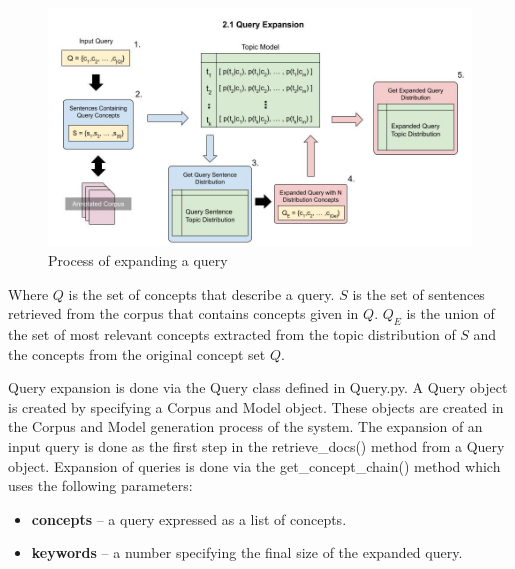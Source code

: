 \begin{figure}[h]
    \centering
         \includegraphics[width=1.0\textwidth]{Figures/System_Design_Query-Based_Retrieval.jpg}
          \caption{Process of expanding a query}
           \label{queryExp}
\end{figure}
Where $Q$ is the set of concepts that describe a query. $S$ is the set of sentences retrieved from the corpus that contains concepts given in $Q$. $Q_E$ is the union of the set of most relevant concepts extracted from the topic distribution of $S$ and the concepts from the original concept set $Q$.

Query expansion is done via the Query class defined in Query.py. A Query object is created by specifying a Corpus and Model object. These objects are created in the Corpus and Model generation process of the system. The expansion of an input query is done as the first step in the retrieve\_docs() method from a Query object. Expansion of queries is done via the get\_concept\_chain() method which uses the following parameters:

\begin{itemize}
    \item \textbf{concepts} – a query expressed as a list of concepts.
    \item \textbf{keywords} – a number specifying the final size of the expanded query.
\end{itemize}

